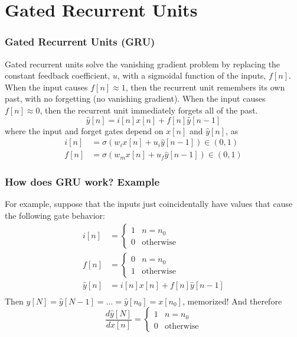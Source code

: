 
\section[GRU]{Gated Recurrent Units}
\setcounter{subsection}{1}

\begin{frame}
  \frametitle{Gated Recurrent Units (GRU)}

  Gated recurrent units solve the vanishing gradient problem by
  replacing the constant feedback coefficient, $u$, with a sigmoidal
  function of the inputs, $f[n]$.  When the input causes $f[n]\approx
  1$, then the recurrent unit remembers its own past, with no
  forgetting (no vanishing gradient).  When the input causes
  $f[n]\approx 0$, then the recurrent unit immediately forgets all of
  the past.
  \[    \hat{y}[n] = i[n]x[n]+f[n]\hat{y}[n-1]
  \]
  where the input and forget gates depend on $x[n]$ and $\hat{y}[n]$, as
  \begin{align*}
    i[n] &= \sigma\left(w_i x[n]+u_i\hat{y}[n-1]\right)\in (0,1)\\
    f[n] &= \sigma\left(w_m x[n]+u_f \hat{y}[n-1]\right)\in (0,1)
  \end{align*}
\end{frame}

\begin{frame}
  \frametitle{How does GRU work? Example}

  For example, suppose that the inputs just coincidentally have values
  that cause the following gate behavior:
  \begin{align*}
    i[n] &=\left\{\begin{array}{ll}
    1 & n=n_0\\
    0 & \mbox{otherwise}
    \end{array}
    \right.\\
    f[n] &=\left\{\begin{array}{ll}
    0 & n=n_0\\
    1 & \mbox{otherwise}
    \end{array}
    \right.\\
    \hat{y}[n] &= i[n]x[n]+f[n]\hat{y}[n-1]\\
  \end{align*}
  Then $\hat{y}[N]=\hat{y}[N-1]=\ldots =\hat{y}[n_0]=x[n_0]$, memorized!  And therefore
  \[
  \frac{d\hat{y}[N]}{dx[n]}=\left\{\begin{array}{ll}
  1 & n=n_0\\
  0 &\mbox{otherwise}
  \end{array}\right.
  \]
\end{frame}

